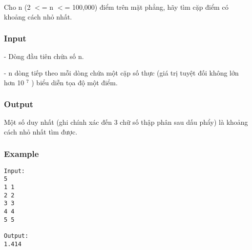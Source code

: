 



   Cho n (2 $<$= n $<$= 100,000) điểm trên mặt phẳng, hãy tìm cặp điểm có khoảng cách nhỏ nhất.  

\subsubsection{   Input  }

   - Dòng đầu tiên chứa số n.  

   - n dòng tiếp theo mỗi dòng chứa một cặp số thực (giá trị tuyệt đối không lớn hơn 10   $^    7   $   ) biểu diễn tọa độ một điểm.  

\subsubsection{   Output  }

   Một số duy nhất (ghi chính xác đến 3 chữ số thập phân sau dấu phẩy) là khoảng cách nhỏ nhất tìm được.  

\subsubsection{   Example  }
\begin{verbatim}
Input:
5
1 1
2 2
3 3
4 4
5 5

Output:
1.414
\end{verbatim}